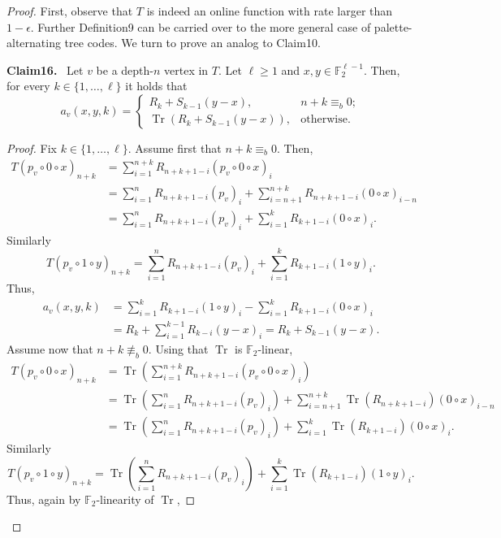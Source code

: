 \documentclass[10pt,a4paper]{article}
\newenvironment{authorclaim}[1]{\par\medskip\noindent\textbf{#1.}\ \ignorespaces}{\par\medskip}
\begin{document}
\begin{proof}
First, observe that $T$ is indeed an online function with rate larger than $1-\epsilon$. Further Definition9 can be carried over to the more general case of palette-alternating tree codes. We turn to prove an analog to Claim10.
\begin{authorclaim}{Claim16}
Let $v$ be a depth-$n$ vertex in $T$. Let $\ell\ge1$ and $x,y\in\mathbb F_2^{\ell-1}$. Then, for every $k\in\{1,\ldots,\ell\}$ it holds that
\[
a_v(x,y,k)=\begin{cases}R_k+S_{k-1}(y-x),&n+k\equiv_b0;\\
\operatorname{Tr}(R_k+S_{k-1}(y-x)),&\text{otherwise}.\end{cases}
\]
\end{authorclaim}
\begin{proof}
Fix $k\in\{1,\ldots,\ell\}$. Assume first that $n+k\equiv_b0$. Then,
\begin{align*}
T(p_v\circ0\circ x)_{n+k}
&=\sum_{i=1}^{n+k}R_{n+k+1-i}(p_v\circ0\circ x)_i\\
&=\sum_{i=1}^nR_{n+k+1-i}(p_v)_i
+\sum_{i=n+1}^{n+k}R_{n+k+1-i}(0\circ x)_{i-n}\\
&=\sum_{i=1}^nR_{n+k+1-i}(p_v)_i
+\sum_{i=1}^kR_{k+1-i}(0\circ x)_i.
\end{align*}
Similarly
\[
T(p_v\circ1\circ y)_{n+k}
=\sum_{i=1}^nR_{n+k+1-i}(p_v)_i+\sum_{i=1}^kR_{k+1-i}(1\circ y)_i.
\]
Thus,
\begin{align*}
a_v(x,y,k)
&=\sum_{i=1}^kR_{k+1-i}(1\circ y)_i-\sum_{i=1}^kR_{k+1-i}(0\circ x)_i\\
&=R_k+\sum_{i=1}^{k-1}R_{k-i}(y-x)_i=R_k+S_{k-1}(y-x).
\end{align*}
Assume now that $n+k\not\equiv_b0$. Using that $\operatorname{Tr}$ is $\mathbb F_2$-linear,
\begin{align*}
T(p_v\circ0\circ x)_{n+k}
&=\operatorname{Tr}\left(\sum_{i=1}^{n+k}R_{n+k+1-i}(p_v\circ0\circ x)_i\right)\\
&=\operatorname{Tr}\left(\sum_{i=1}^nR_{n+k+1-i}(p_v)_i\right)
+\sum_{i=n+1}^{n+k}\operatorname{Tr}(R_{n+k+1-i})(0\circ x)_{i-n}\\
&=\operatorname{Tr}\left(\sum_{i=1}^nR_{n+k+1-i}(p_v)_i\right)
+\sum_{i=1}^k\operatorname{Tr}(R_{k+1-i})(0\circ x)_i.
\end{align*}
Similarly
\[
T(p_v\circ1\circ y)_{n+k}
=\operatorname{Tr}\left(\sum_{i=1}^nR_{n+k+1-i}(p_v)_i\right)
+\sum_{i=1}^k\operatorname{Tr}(R_{k+1-i})(1\circ y)_i.
\]
Thus, again by $\mathbb F_2$-linearity of $\operatorname{Tr}$,

\end{proof}
\end{proof}
\end{document}
